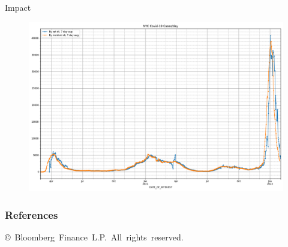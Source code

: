 \documentclass[aspectratio=169]{beamer}
\begin{document}
\begin{frame}{Impact}
  \begin{figure}
    \centering
    \includegraphics[height=1\textheight]{../Notebooks/casesPerDayHistoryRptDtVsInDt.png}
  \end{figure}
\end{frame}

\begin{frame}[allowframebreaks]
  \frametitle{References}
  \label{refs}
  \begin{small}
  \printbibliography
  \end{small}
\vfil
\vbox{\hbox{\tiny{\copyright~Bloomberg Finance L.P. All rights reserved.}}
}%
\end{frame}
\end{document}

